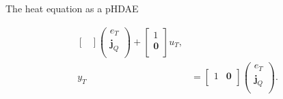 \documentclass[aspectratio=169]{ISAE-Beamer}
\begin{document}
\begin{frame}{The heat equation as a pHDAE}
\begin{overlayarea}{\textwidth}{\textheight}
{\begin{equation*}
\begin{aligned}
\begin{bmatrix}
\end{bmatrix}
\begin{pmatrix}
e_T \\
\bm{j}_Q \\
\end{pmatrix} + 
\begin{bmatrix}
1 \\
\bm{0} \\
\end{bmatrix} u_T, \\
y_T &= \begin{bmatrix}
1 & \bm{0} \\
\end{bmatrix} \begin{pmatrix}
e_T \\
\bm{j}_Q \\
\end{pmatrix}.
\end{aligned}
\end{equation*}
}
\end{overlayarea}

\end{frame}
\end{document}
